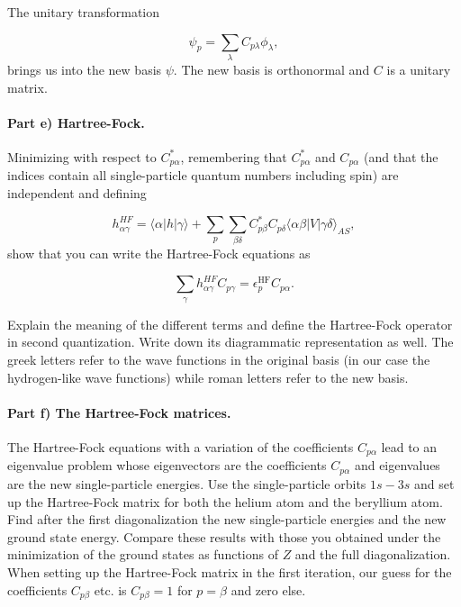 \documentclass[a4,10pt]{article}
\begin{document}
The unitary transformation

\begin{equation*}
\psi_p  = \sum_{\lambda} C_{p\lambda}\phi_{\lambda},
\end{equation*}
brings us into the new basis $\psi$.  The new basis is orthonormal and $C$ is a unitary matrix.

\paragraph{Part e) Hartree-Fock.}
Minimizing with respect to $C^*_{p\alpha}$, remembering that
$C^*_{p\alpha}$ and $C_{p\alpha}$ (and that the indices contain all
single-particle quantum numbers including spin) are independent and
defining

\begin{equation*}
h_{\alpha\gamma}^{HF}=\langle \alpha | h | \gamma \rangle+
\sum_{p}\sum_{\beta\delta} C^*_{p\beta}C_{p\delta}\langle \alpha\beta|V|\gamma\delta\rangle_{AS},
\end{equation*}
show that you can write the Hartree-Fock  equations as

\begin{equation*}
\sum_{\gamma}h_{\alpha\gamma}^{HF}C_{p\gamma}=\epsilon_p^{\mathrm{HF}}C_{p\alpha}.
\label{eq:newhf}
\end{equation*}

Explain the meaning of the different terms and define the Hartree-Fock
operator in second quantization. Write down its diagrammatic
representation as well.  The greek letters refer to the wave functions
in the original basis (in our case the hydrogen-like wave functions)
while roman letters refer to the new basis.

\paragraph{Part f) The Hartree-Fock matrices.}
The Hartree-Fock equations with a variation of the coefficients
$C_{p\alpha}$ lead to an eigenvalue problem whose eigenvectors are the
coefficients $C_{p\alpha}$ and eigenvalues are the new single-particle
energies.  Use the single-particle orbits $1s-3s$ and set up the
Hartree-Fock matrix for both the helium atom and the beryllium
atom. Find after the first diagonalization the new single-particle
energies and the new ground state energy.  Compare these results with
those you obtained under the minimization of the ground states as
functions of $Z$ and the full diagonalization. When setting up the
Hartree-Fock matrix in the first iteration, our guess for the
coefficients $C_{p\beta}$ etc. is $C_{p\beta}=1$ for $p=\beta$ and
zero else.
\end{document}
